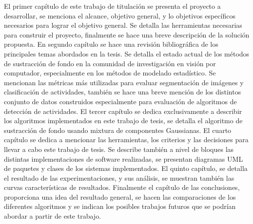 El primer capítulo de este trabajo de titulación se presenta el proyecto a desarrollar, se menciona el alcance, objetivo general, y lo objetivos específicos necesarios para lograr el objetivo general. Se detalla las herramientas necesarias para construir el proyecto, finalmente se hace una breve descripción de la solución propuesta. En segundo capítulo se hace una revisión bibliográfica de los principales temas abordados en la tesis. Se detalla el estado actual de los métodos de sustracción de fondo en la comunidad de investigación en visión por computador, especialmente en los métodos de modelado estadístico. Se mencionan las métricas más utilizadas para evaluar segmentación de imágenes y clasificación de actividades, también se hace una breve mención de los distintos conjunto de datos construidos especialmente para evaluación de algoritmos de detección de actividades. El tercer capítulo se dedica exclusivamente a describir los algoritmos implementados en este trabajo de tesis, se detalla el algoritmo de sustracción de fondo usando mixtura de componentes Gaussianas. El cuarto capítulo se dedica a mencionar las herramientas, los criterios y las decisiones para llevar a cabo este trabajo de tesis. Se describe también a nivel de bloques las distintas implementaciones de software realizadas, se presentan diagramas UML de paquetes y clases de los sistemas implementados. El quinto capítulo, se detalla el resultado de las experimentaciones, y sus análisis, se muestran también las curvas características de resultados. Finalmente el capítulo de las conclusiones, proporciona una idea del resultado general, se hacen las comparaciones de los diferentes algoritmos y se indican los posibles trabajos futuros que se podrían abordar a partir de este trabajo.



